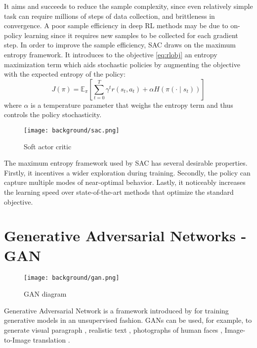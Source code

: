 It aims and succeeds to reduce the sample complexity, since even relatively simple task can require millions of steps of data collection, and brittleness in convergence. A poor sample efficiency in deep RL methods may be due to on-policy learning since it requires new samples to be collected for each gradient step. In order to improve the sample efficiency, SAC draws on the maximum entropy framework. It introduces to the objective \ref{eq:rlobj} an entropy maximization term which aids stochastic policies by augmenting the objective with the expected entropy of the policy:
\begin{equation}
  J(\pi)=\mathbb{E}_{\pi}[\sum _{t=0}^{T}\gamma ^{t}r(s_{t},a_{t})+\alpha H(\pi(\cdot \mid s_{t}))]
\end{equation}
where $\alpha$ is a temperature parameter that weighs the entropy term and thus controls the policy stochasticity.


\begin{figure}[h]
  \begin{center}
    \texttt{[image: background/sac.png]}
  \end{center}
  \caption{Soft actor critic}
  \label{fig:sac}
\end{figure}

The maximum entropy framework used by SAC has several desirable properties. Firstly, it incentives a wider exploration during training. Secondly, the policy can capture multiple modes of near-optimal behavior. Lastly, it noticeably increases the learning speed over state-of-the-art methods that optimize the standard objective.

\section{Generative Adversarial Networks - GAN}
\begin{wrapfigure}{r}{0.6\textwidth}
  \begin{center}
    \texttt{[image: background/gan.png]}
  \end{center}
  \caption{GAN diagram}
  \label{fig:gan}
\end{wrapfigure}

Generative Adversarial Network is a framework introduced by \citet{art:gan} for training generative models in an unsupervised fashion. GANs can be used, for example, to generate visual paragraph \citep{Liang_2017_ICCV}, realistic text \citep{pmlr-v70-zhang17b}, photographs of human faces \citep{https://doi.org/10.48550/arxiv.1710.10196}, Image-to-Image translation \citep{Isola_2017_CVPR}.

